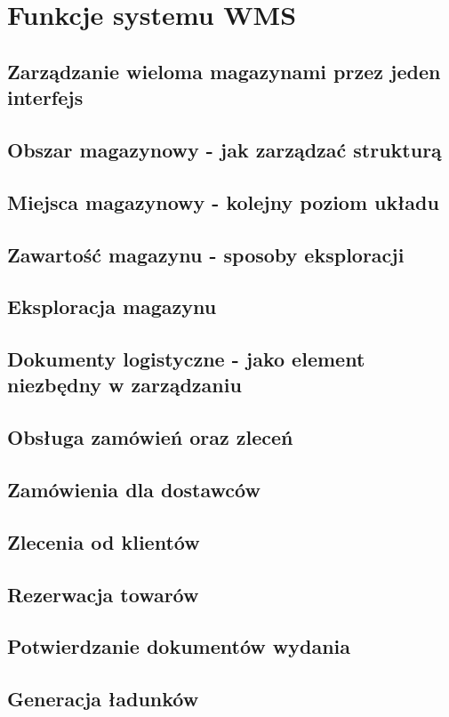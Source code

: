\section{Funkcje systemu WMS}
	\subsection{Zarządzanie wieloma magazynami przez jeden interfejs}
	\subsection{Obszar magazynowy - jak zarządzać strukturą}
	\subsection{Miejsca magazynowy - kolejny poziom układu}
	\subsection{Zawartość magazynu - sposoby eksploracji}
	\subsection{Eksploracja magazynu}
	\subsection{Dokumenty logistyczne - jako element niezbędny w zarządzaniu}
	\subsection{Obsługa zamówień oraz zleceń}
	\subsection{Zamówienia dla dostawców}
	\subsection{Zlecenia od klientów}
	\subsection{Rezerwacja towarów}
	\subsection{Potwierdzanie dokumentów wydania}
	\subsection{Generacja ładunków}
